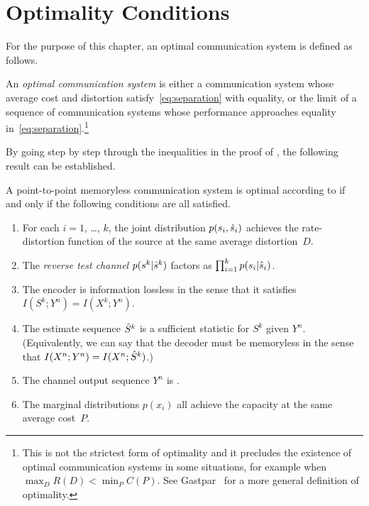 \section{Optimality Conditions}\label{sec:optimality}

For the purpose of this chapter, an optimal communication system is
defined as follows.

\begin{definition}
  \label{def:optimality}
  An \emph{optimal communication system} is either a communication system whose
  average cost and distortion satisfy~\eqref{eq:separation} with equality, or
  the limit of a sequence of communication systems whose performance approaches
  equality in~\eqref{eq:separation}.\footnote{This is not the strictest form of
  optimality and it precludes the existence of optimal communication systems in
  some situations, for example when $\max_D R(D) < \min_P C(P)$. See
  Gastpar~\cite{GastparThesis} for a more general  definition of optimality.}
\end{definition}

By going step by step through the inequalities in the proof of
, the following result can be established. 

\begin{theorem}
  \label{thm:optimalityconditions}
  A point-to-point memoryless communication system is optimal according to
   if and only if the following conditions are all satisfied.
  \begin{enumerate}
    \item For each $i = 1$, \dots, $k$, the joint distribution $p(s_i,{\hat{s}}_i)$
      achieves the rate-distortion function of the source at the same average
      distortion~$D$.
    \item The \emph{reverse test channel} $p(s^k|{\hat{s}}^k)$ factors as
      $\prod_{i=1}^k p(s_i | {\hat{s}}_i)$. 
    \item The encoder is information lossless in the sense that it satisfies
      $I(S^k;Y^n) = I(X^k; Y^n)$. 
    \item The estimate sequence ${\hat{S}}^k$ is a sufficient statistic for $S^k$
      given $Y^n$. (Equivalently, we can say that the decoder must be memoryless
      in the sense that $I(X^n;Y^n) = I(X^n;{\hat{S}}^k)$.)
    \item The channel output sequence $Y^n$ is \iid.
    \item The marginal distributions $p(x_i)$ all achieve the capacity at the
      same average cost~$P$.
  \end{enumerate}
\end{theorem}

